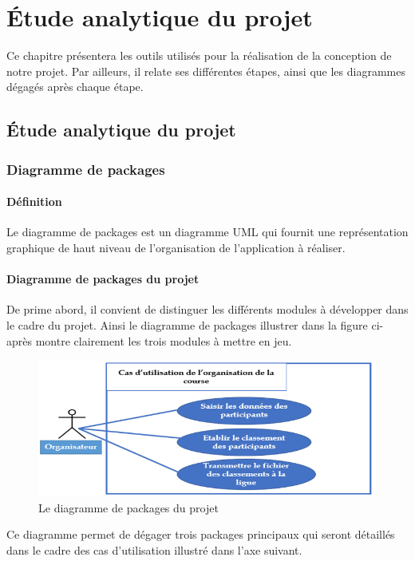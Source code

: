 \chapter{Étude analytique du projet}

Ce chapitre présentera les outils utilisés pour la réalisation de la conception de notre projet. Par ailleurs, il relate ses différentes étapes, ainsi que les diagrammes dégagés après chaque étape.
\newpage
\section {Étude analytique du projet}


\subsection {Diagramme de packages }
\subsubsection{Définition}
Le diagramme de packages est un diagramme UML qui fournit une représentation graphique de haut niveau de l'organisation de l’application à réaliser.
\subsubsection{Diagramme de packages du projet}
De prime abord, il convient de distinguer les différents modules à développer dans le cadre du projet. Ainsi le diagramme de packages illustrer dans la figure ci-après montre clairement les trois modules à mettre en jeu.
\begin{figure}[!h]
	   \center
	   \includegraphics[scale=0.9]{Diagramme_de_packages.png}
	   \caption {Le diagramme de packages du projet}
\end{figure}

Ce diagramme permet de dégager trois packages principaux qui seront détaillés dans le cadre des cas d’utilisation illustré dans l’axe suivant.



